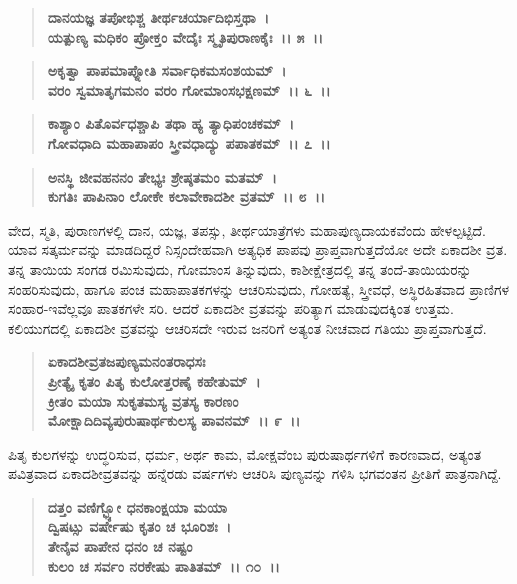 \begin{verse}
\textbf{ದಾನಯಜ್ಞ ತಪೋಭಿಶ್ಚ ತೀರ್ಥಚರ್ಯಾದಿಭಿಸ್ತಥಾ~।}\\\textbf{ಯತ್ಪುಣ್ಯ ಮಧಿಕಂ ಪ್ರೋಕ್ತಂ ವೇದೈಃ ಸ್ಮೃತಿಪುರಾಣಕೈಃ~।। ೫~।।}
\end{verse}

\begin{verse}
\textbf{ಅಕೃತ್ವಾ ಪಾಪಮಾಪ್ನೋತಿ ಸರ್ವಾಧಿಕಮಸಂಶಯಮ್~।}\\\textbf{ವರಂ ಸ್ವಮಾತೃಗಮನಂ ವರಂ ಗೋಮಾಂಸಭಕ್ಷಣಮ್~।। ೬~।।}
\end{verse}

\begin{verse}
\textbf{ಕಾಶ್ಯಾಂ ಪಿತೊರ್ವಧಶ್ಚಾಪಿ ತಥಾ ಹ್ಯ ತ್ಯಾಧಿಪಂಚಕಮ್~।}\\\textbf{ಗೋವಧಾದಿ ಮಹಾಪಾಪಂ ಸ್ತ್ರೀವಧಾದ್ಯು ಪಪಾತಕಮ್~।। ೭~।। }
\end{verse}

\begin{verse}
\textbf{ಅನಸ್ಥಿ ಜೀವಹನನಂ ತೇಭ್ಯಃ ಶ್ರೇಷ್ಠತಮಂ ಮತಮ್~।}\\\textbf{ಕುಗತಿಃ ಪಾಪಿನಾಂ ಲೋಕೇ ಕಲಾವೇಕಾದಶೀ ವ್ರತಮ್~।। ೮~।।}
\end{verse}

ವೇದ, ಸ್ಮತಿ, ಪುರಾಣಗಳಲ್ಲಿ ದಾನ, ಯಜ್ಞ, ತಪಸ್ಸು, ತೀರ್ಥಯಾತ್ರೆಗಳು ಮಹಾಪುಣ್ಯದಾಯಕವೆಂದು ಹೇಳಲ್ಪಟ್ಟಿದೆ. ಯಾವ ಸತ್ಕರ್ಮವನ್ನು ಮಾಡದಿದ್ದರೆ ನಿಸ್ಸಂದೇಹವಾಗಿ ಅತ್ಯಧಿಕ ಪಾಪವು ಪ್ರಾಪ್ತವಾಗುತ್ತದೆಯೋ ಅದೇ ಏಕಾದಶೀ ವ್ರತ. ತನ್ನ ತಾಯಿಯ ಸಂಗಡ ರಮಿಸುವುದು, ಗೋಮಾಂಸ ತಿನ್ನುವುದು, ಕಾಶೀಕ್ಷೇತ್ರದಲ್ಲಿ ತನ್ನ ತಂದೆ-ತಾಯಿಯರನ್ನು ಸಂಹರಿಸುವುದು, ಹಾಗೂ ಪಂಚ ಮಹಾಪಾತಕಗಳನ್ನು ಆಚರಿಸುವುದು, ಗೋಹತ್ಯೆ, ಸ್ತ್ರೀವಧೆ, ಅಸ್ಥಿರಹಿತವಾದ ಪ್ರಾಣಿಗಳ ಸಂಹಾರ-ಇವೆಲ್ಲವೂ ಪಾತಕಗಳೇ ಸರಿ. ಆದರೆ ಏಕಾದಶೀ ವ್ರತವನ್ನು ಪರಿತ್ಯಾಗ ಮಾಡುವುದಕ್ಕಿಂತ ಉತ್ತಮ. ಕಲಿಯುಗದಲ್ಲಿ ಏಕಾದಶೀ ವ್ರತವನ್ನು ಆಚರಿಸದೇ ಇರುವ ಜನರಿಗೆ ಅತ್ಯಂತ ನೀಚವಾದ ಗತಿಯು ಪ್ರಾಪ್ತವಾಗುತ್ತದೆ.

\begin{verse}
\textbf{ಏಕಾದಶೀವ್ರತಜಪುಣ್ಯಮನಂತರಾಧಸಃ} \\\textbf{ಪ್ರೀತ್ಯೈ ಕೃತಂ ಪಿತೃ ಕುಲೋತ್ತರಣೈ ಕಹೇತುಮ್~।}\\\textbf{ಕ್ರೀತಂ ಮಯಾ ಸುಕೃತಮಸ್ಯ ವ್ರತಸ್ಯ ಕಾರಣಂ} \\\textbf{ಮೋಕ್ಷಾದಿದಿವ್ಯಪುರುಷಾರ್ಥಕುಲಸ್ಯ ಪಾವನಮ್~।। ೯~।।}
\end{verse}

ಪಿತೃ ಕುಲಗಳನ್ನು ಉದ್ಧರಿಸುವ, ಧರ್ಮ, ಅರ್ಥ ಕಾಮ, ಮೋಕ್ಷವೆಂಬ ಪುರುಷಾರ್ಥಗಳಿಗೆ ಕಾರಣವಾದ, ಅತ್ಯಂತ ಪವಿತ್ರವಾದ ಏಕಾದಶೀವ್ರತವನ್ನು ಹನ್ನೆರಡು ವರ್ಷಗಳು ಆಚರಿಸಿ ಪುಣ್ಯವನ್ನು ಗಳಿಸಿ ಭಗವಂತನ ಪ್ರೀತಿಗೆ ಪಾತ್ರನಾಗಿದ್ದೆ.

\begin{verse}
\textbf{ದತ್ತಂ ವಣಿಗ್ಭ್ಯೋ ಧನಕಾಂಕ್ಷಯಾ ಮಯಾ} \\\textbf{ದ್ವಿಷಟ್ಸು ವರ್ಷೇಷು ಕೃತಂ ಚ ಭೂರಿಶಃ~।}\\\textbf{ತೇನೈವ ಪಾಪೇನ ಧನಂ ಚ ನಷ್ಟಂ} \\\textbf{ಕುಲಂ ಚ ಸರ್ವಂ ನರಕೇಷು ಪಾತಿತಮ್~।। ೧೦~।।}
\end{verse}

